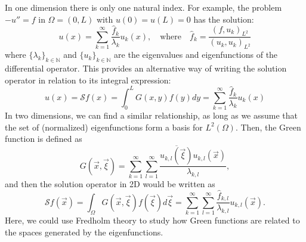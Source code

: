 In one dimension there is only one natural index. For example, the problem $-u''=f$ in $\Omega=(0,L)$ with $u(0)=u(L)=0$ has the solution: 
\begin{equation}
    u(x)=\sum_{k=1}^{\infty}\frac{\hat{f}_{k}}{\lambda_{k}}u_{k}(x), \quad \text{where} \quad \hat{f}_{k}=\frac{(f,u_{k})_{L^{2}}}{(u_{k},u_{k})_{L^{2}}}
\end{equation}
where $\{\lambda_{k}\}_{k\in\mathbb{N}}$ and $\{u_{k}\}_{k\in\mathbb{N}}$ are the eigenvalues and eigenfunctions of the differential operator. This provides an alternative way of writing the solution operator in relation to its integral expression: 
\begin{equation}
    u(x)=\mathcal{S}f(x)=\int_{0}^{L}G(x,y)f(y)dy=\sum_{k=1}^{\infty}\frac{\hat{f}_{k}}{\lambda_{k}}u_{k}(x)
\end{equation}
In two dimensions, we can find a similar relationship, as long as we assume that the set of (normalized) eigenfunctions form a basis for $L^{2}(\Omega)$. Then, the Green function is defined as
\begin{equation}
    G(\vec{x},\vec{\xi})=\sum_{k=1}^{\infty}\sum_{l=1}^{\infty}\frac{\overline{u_{k,l}(\vec{\xi})}u_{k,l}(\vec{x})}{\lambda_{k,l}},
\end{equation}
and then the solution operator in 2D would be written as
\begin{equation}
    \mathcal{S}f(\vec{x})=\int_{\Omega}G(\vec{x},\vec{\xi})f(\vec{\xi})d\vec{\xi}=\sum_{k=1}^{\infty}\sum_{l=1}^{\infty}\frac{\hat{f}_{k,l}}{\lambda_{k,l}}u_{k,l}(\vec{x}).
\end{equation}
Here, we could use Fredholm theory to study how Green functions are related to the spaces generated by the eigenfunctions. 
